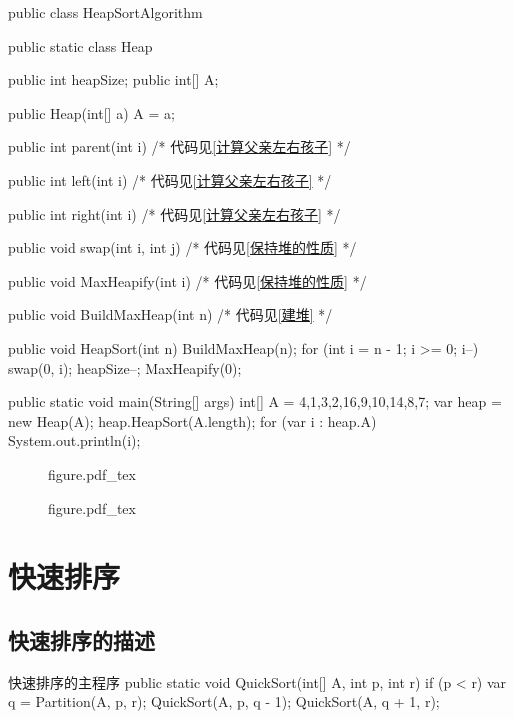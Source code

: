 \documentclass[oneside,10pt,fontset=none]{ctexbook}
\numberwithin{definition}{chapter}
\numberwithin{theorem}{chapter}
\numberwithin{lemma}{chapter}
\begin{document}
\begin{myjava}{}{}{}
public class HeapSortAlgorithm {
    public static class Heap {
        public int heapSize;
        public int[] A;

        public Heap(int[] a) {
            A = a;
        }

        public int parent(int i) {/* 代码见\ref{计算父亲左右孩子} */}

        public int left(int i) {/* 代码见\ref{计算父亲左右孩子} */}
    
        public int right(int i) {/* 代码见\ref{计算父亲左右孩子} */}

        public void swap(int i, int j) {/* 代码见\ref{保持堆的性质} */}

        public void MaxHeapify(int i) {/* 代码见\ref{保持堆的性质} */}

        public void BuildMaxHeap(int n) {/* 代码见\ref{建堆} */}

        public void HeapSort(int n) {
            BuildMaxHeap(n);
            for (int i = n - 1; i >= 0; i--) {
                swap(0, i);
                heapSize--;
                MaxHeapify(0);
            }
        }
    }

    public static void main(String[] args) {
        int[] A = {4,1,3,2,16,9,10,14,8,7};
        var heap = new Heap(A);
        heap.HeapSort(A.length);
        for (var i : heap.A)
            System.out.println(i);
    }
}
\end{myjava}

\begin{figure}[htbp]
    \def\svgwidth{\columnwidth}
    {figure.pdf_tex}
\end{figure}

\begin{figure}[htbp]
    \def\svgwidth{\columnwidth}
    {figure.pdf_tex}
\end{figure}

\chapter{快速排序}

\section{快速排序的描述}

\begin{myjava}{}{快速排序的主程序}{}
    public static void QuickSort(int[] A, int p, int r) {
        if (p < r) {
            var q = Partition(A, p, r);
            QuickSort(A, p, q - 1);
            QuickSort(A, q + 1, r);
        }
    }
\end{myjava}
\end{document}
